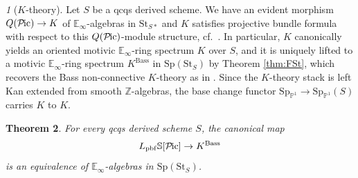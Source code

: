 \documentclass{amsart}
\theoremstyle{plain}
\newtheorem{theorem}{Theorem}[subsection]
\theoremstyle{definition}
\theoremstyle{remark}
\newtheorem{p}[theorem]{}
\numberwithin{equation}{theorem}
\newcommand{\mbb}[1]{\mathbb{#1}}
\newcommand{\Bass}{\mathrm{Bass}}
\newcommand{\Sp}{\mathrm{Sp}}
\newcommand{\St}{\mathrm{St}}
\newcommand{\pbf}{\mathrm{pbf}}
\newcommand{\SpP}{\mathrm{Sp}_{\mathbb{P}^1}}
\newcommand{\Pic}{{\mathcal{P}\mspace{-2.0mu}\mathrm{ic}}}
\begin{document}
\begin{p}[$K$-theory]
Let $S$ be a qcqs derived scheme.
We have an evident morphism $Q(\Pic)\to K$ of $\mbb{E}_\infty$-algebras in $\St_{S*}$ and $K$ satisfies projective bundle formula with respect to this $Q(\Pic)$-module structure, cf.\ \cite[Theorem B]{Kha}.
In particular, $K$ canonically yields an oriented motivic $\mbb{E}_\infty$-ring spectrum $K$ over $S$, and it is uniquely lifted to a motivic $\mbb{E}_\infty$-ring spectrum $K^\Bass$ in $\Sp(\St_S)$ by Theorem \ref{thm:FSt}, which recovers the Bass non-connective $K$-theory as in \cite{TT,BGT}.
Since the $K$-theory stack is left Kan extended from smooth $\mbb{Z}$-algebras, the base change functor $\SpP\to\SpP(S)$ carries $K$ to $K$.
\end{p}

\begin{theorem}\label{thm:AlK}
For every qcqs derived scheme $S$, the canonical map
\[
	L_\pbf\mbb{S}[\Pic] \to K^\Bass
\]
is an equivalence of $\mbb{E}_\infty$-algebras in $\Sp(\St_S)$.
\end{theorem}
\end{document}
